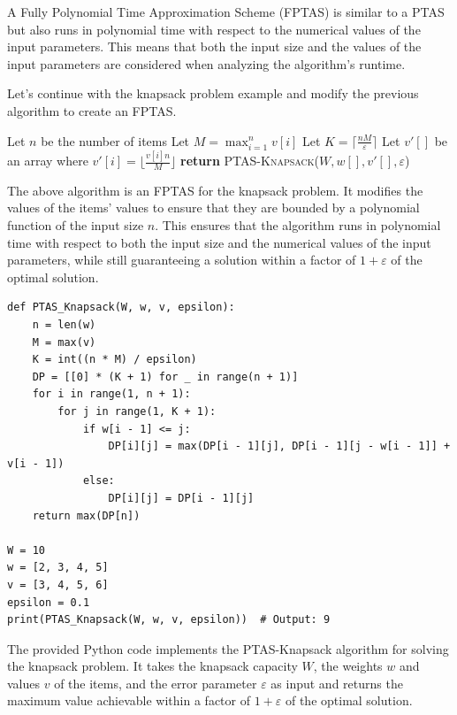 \documentclass[12pt]{book} %
\begin{document}
A Fully Polynomial Time Approximation Scheme (FPTAS) is similar to a PTAS but also runs in polynomial time with respect to the numerical values of the input parameters. This means that both the input size and the values of the input parameters are considered when analyzing the algorithm's runtime.

Let's continue with the knapsack problem example and modify the previous algorithm to create an FPTAS.
\FloatBarrier
\begin{algorithm}
\caption{Fully Polynomial Time Approximation Scheme for Knapsack Problem}
\begin{algorithmic}[1]
    \State Let $n$ be the number of items
    \State Let $M = \max_{i=1}^{n} v[i]$
    \State Let $K = \lceil \frac{nM}{\varepsilon} \rceil$
    \State Let $v'[]$ be an array where $v'[i] = \lfloor \frac{v[i]n}{M} \rfloor$
    \State \textbf{return} \textsc{PTAS-Knapsack}($W, w[], v'[], \varepsilon$)
\EndFunction
\end{algorithmic}
\end{algorithm}
\FloatBarrier
The above algorithm is an FPTAS for the knapsack problem. It modifies the values of the items' values to ensure that they are bounded by a polynomial function of the input size \(n\). This ensures that the algorithm runs in polynomial time with respect to both the input size and the numerical values of the input parameters, while still guaranteeing a solution within a factor of \(1 + \varepsilon\) of the optimal solution.

\FloatBarrier
\begin{lstlisting}
def PTAS_Knapsack(W, w, v, epsilon):
    n = len(w)
    M = max(v)
    K = int((n * M) / epsilon)
    DP = [[0] * (K + 1) for _ in range(n + 1)]
    for i in range(1, n + 1):
        for j in range(1, K + 1):
            if w[i - 1] <= j:
                DP[i][j] = max(DP[i - 1][j], DP[i - 1][j - w[i - 1]] + v[i - 1])
            else:
                DP[i][j] = DP[i - 1][j]
    return max(DP[n])

W = 10
w = [2, 3, 4, 5]
v = [3, 4, 5, 6]
epsilon = 0.1
print(PTAS_Knapsack(W, w, v, epsilon))  # Output: 9
\end{lstlisting}
\FloatBarrier

The provided Python code implements the PTAS-Knapsack algorithm for solving the knapsack problem. It takes the knapsack capacity \(W\), the weights \(w\) and values \(v\) of the items, and the error parameter \(\varepsilon\) as input and returns the maximum value achievable within a factor of \(1 + \varepsilon\) of the optimal solution.
\end{document}
